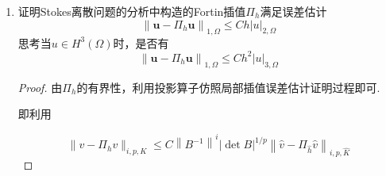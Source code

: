 \documentclass[12pt,a4paper]{article}
\begin{document}
\begin{enumerate}
\begin{enumerate}
			\begin{proof}
				通过尺度变换技巧变换到参考单元：
				$$|\Pi_{h}^2{v}|_{1,K}=|\widehat{\Pi_{h}^2{v}}|_{1,\hat{K}}\leq C||\hat{v}||_{1,\hat{K}}\leq C(h_{K}^{-1}|{v}|_{0,K}+|{v}|_{1,K}).$$
				再利用逆估计得到结果.
			\end{proof}
			
			\item $b(\Pi_h^2\mathbf{v},q_h)=b(\mathbf{v},q_h),\:\forall q_h\in Q_h$
			
			\begin{proof}
				由$\Pi_h^2 v$的定义有
				\begin{equation*}
					\begin{aligned}
						&\int_e (v-\Pi^2_h v) \cdot \nu q_h ds=0,\quad \forall q_h \in Q_h, \quad \forall e \in \partial K \\
						\Rightarrow & \int_{\partial K} (v-\Pi^2_h v) \cdot \nu q_h ds=0 ,\quad \forall q_h \in Q_h\\
						\Rightarrow & \int_K \mathrm{div}(v-\Pi^2_{h}v) q_h dx = 0,\quad \forall q_h \in Q_h, \quad \forall K \subset \Gamma_h \\
						\Rightarrow & \int_{\Omega} \mathrm{div}(v-\Pi^2_{h}v) q_h dx = 0,\quad \forall q_h \in Q_h \\
						\Rightarrow & b(v-\Pi^2_{h}v,q_h) = 0,\quad \forall q_h \in Q_h		
					\end{aligned}
				\end{equation*}
				
			\end{proof}
		\end{enumerate}
	
		\item 证明Stokes离散问题的分析中构造的Fortin插值$\Pi_h$满足误差估计
		$$\left\|\mathbf{u}-\Pi_h\mathbf{u}\right\|_{1,\Omega}\leq Ch\left|u\right|_{2,\Omega}$$
		思考当$u\in H^3(\Omega)$时，是否有
		$$\left\|\mathbf{u}-\Pi_h\mathbf{u}\right\|_{1,\Omega}\leq Ch^2\left|u\right|_{3,\Omega}$$
		
		\begin{proof}
			由$\Pi_h$的有界性，利用投影算子仿照局部插值误差估计证明过程即可.
			
			即利用
			
			$$\|v-\Pi_h v\|_{i,p,K}\leq C\left\|B^{-1}\right\|^i|\det B|^{1/p}\left\|\widehat{v}-\Pi_{\widehat{h}}\widehat{v}\right\|_{i,p,\widehat{K}}$$
			

\end{proof}
\end{enumerate}
\end{document}
